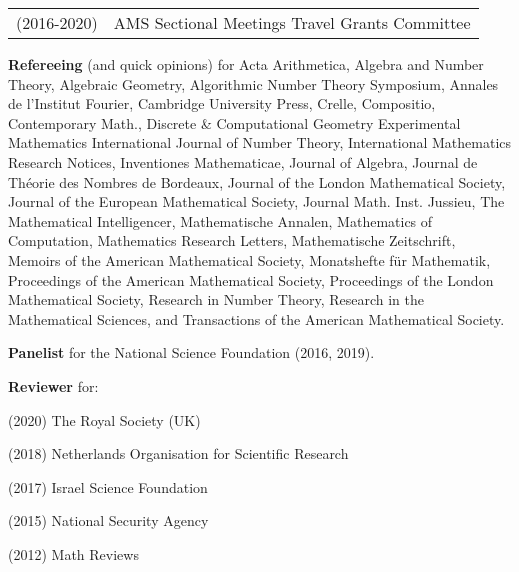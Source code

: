 \documentclass[margin,line]{res}
\newenvironment{list1}{
  \begin{list}{\ding{113}}{%
      \setlength{\itemsep}{0in}
      \setlength{\parsep}{0in} \setlength{\parskip}{0in}
      \setlength{\topsep}{0in} \setlength{\partopsep}{0in}
      \setlength{\leftmargin}{0.17in}}}{\end{list}}
\begin{document}
\begin{resume}
\begin{tabular}{ll}
(2016-2020) & AMS Sectional Meetings Travel Grants Committee \\
\end{tabular}

\textbf{Refereeing} (and quick opinions) for 
Acta Arithmetica,
Algebra and Number Theory, 
Algebraic Geometry,
Algorithmic Number Theory Symposium,  
Annales de l'Institut Fourier,
Cambridge University Press,
Crelle, 
Compositio,
Contemporary Math., 
Discrete \& Computational Geometry
Experimental Mathematics
International Journal of Number Theory, 
International Mathematics Research Notices,
Inventiones Mathematicae, 
Journal of Algebra, 
Journal de  Th\'eorie des Nombres de Bordeaux,
Journal of the London Mathematical Society,
Journal of the European Mathematical Society,
Journal Math. Inst. Jussieu,
The Mathematical Intelligencer, %
Mathematische Annalen,
Mathematics of Computation, 
Mathematics Research Letters, 
Mathematische Zeitschrift,
Memoirs of the American Mathematical Society, %
Monatshefte für Mathematik,
Proceedings of the American Mathematical Society,
Proceedings of the London Mathematical Society, 
Research in Number Theory, 
Research in the Mathematical Sciences,
and 
Transactions of the American Mathematical Society.


\textbf{Panelist} for the National Science Foundation (2016, 2019).

\vspace{-5pt}
\textbf{Reviewer} for: 
\begin{list1}
\item[] (2020) The Royal Society (UK)
\item[] (2018) Netherlands Organisation for Scientific Research
\item[] (2017) Israel Science Foundation 
\item[] (2015) National Security Agency 
\item[] (2012) Math Reviews
\end{list1}
\vspace{.05in} 



\end{resume}
\end{document}
